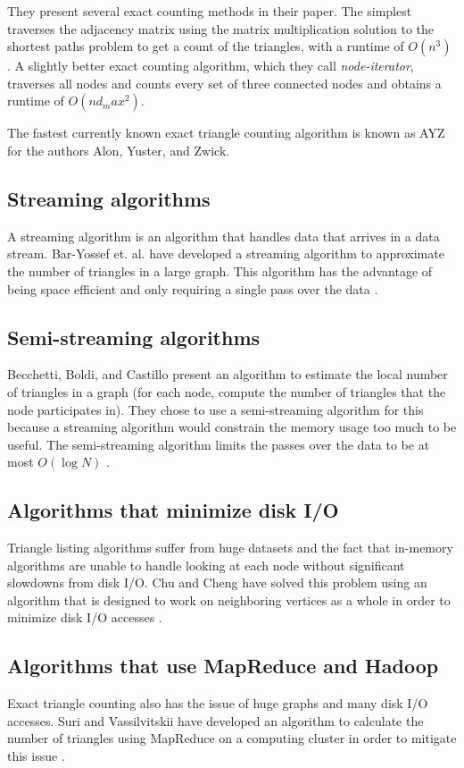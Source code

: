 \documentclass{acm_proc_article-sp}
\begin{document}
They present several exact counting methods in their paper. The simplest
traverses
the adjacency matrix using the matrix multiplication solution to the shortest
paths problem to get a count of the triangles, with a runtime of $O(n^3)$
\cite{schank:counting}. A slightly better exact counting algorithm, which they
call \textit{node-iterator}, traverses all nodes and counts every
set of three connected nodes and obtains a runtime of $O(nd_max^2)$.

The fastest currently known exact triangle counting algorithm is known as AYZ
for the authors Alon, Yuster, and Zwick. \cite{ayz}

\subsection{Streaming algorithms}
A streaming algorithm is an algorithm that handles data that arrives in a
data stream. Bar-Yossef et. al. have developed a streaming algorithm to
approximate the number of triangles in a large graph. This algorithm has the
advantage of being space efficient and only requiring a single pass over the
data \cite{baryossef}. 

\subsection{Semi-streaming algorithms}
Becchetti, Boldi, and Castillo present an algorithm to estimate the local
number of triangles in a graph (for each node, compute the number of triangles
that the node participates in). They chose to use a semi-streaming algorithm
for this because a streaming algorithm would constrain the memory usage too
much to be useful. The semi-streaming algorithm limits the passes over the data
to be at most $O(\log N)$ \cite{becchetti}.

\subsection{Algorithms that minimize disk I/O}
Triangle listing algorithms suffer from huge datasets and the fact that
in-memory algorithms are unable to handle looking at each node without
significant slowdowns from disk I/O. Chu and Cheng have solved this problem
using an algorithm that is designed to work on neighboring vertices as a whole
in order to minimize disk I/O accesses \cite{chu}.

\subsection{Algorithms that use MapReduce and Hadoop}
Exact triangle counting also has the issue of huge graphs and many disk I/O
accesses. Suri and Vassilvitskii have developed an algorithm to calculate the
number of triangles using MapReduce on a computing cluster in order to mitigate
this issue \cite{suri}.
\end{document}
